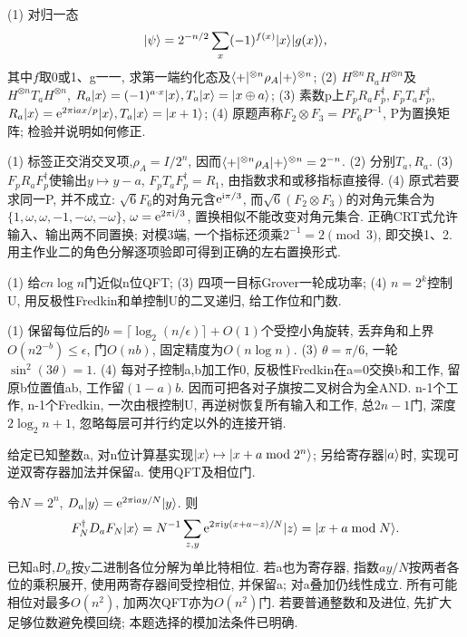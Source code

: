 \begin{exercise}(1) 对归一态
\[\lvert \psi\rangle=2^{-n/2}\sum_x(-1)^{f(x)}\lvert x\rangle\lvert g(x)\rangle,\]
其中$f$取0或1、g一一, 求第一端约化态及$\langle +\rvert^{\otimes n}\rho_A\lvert +\rangle^{\otimes n}$; (2) $H^{\otimes n}R_aH^{\otimes n}$及$H^{\otimes n}T_aH^{\otimes n}$, $R_a\lvert x\rangle=(-1)^{a\cdot x}\lvert x\rangle,T_a\lvert x\rangle=\lvert x\oplus a\rangle$; (3) 素数p上$F_pR_aF_p^\dagger,F_pT_aF_p^\dagger$,$R_a\lvert x\rangle=\mathrm e^{2\pi\mathrm i ax/p}\lvert x\rangle,T_a\lvert x\rangle=\lvert x+1\rangle$; (4) 原题声称$F_2\otimes F_3=PF_6P^{-1}$, P为置换矩阵; 检验并说明如何修正.\end{exercise}
\begin{solution}(1) 标签正交消交叉项,$\rho_A=I/2^n$, 因而$\langle +\rvert^{\otimes n}\rho_A\lvert +\rangle^{\otimes n}=2^{-n}$. (2) 分别$T_a,R_a$. (3) $F_pR_aF_p^\dagger$使输出$y\mapsto y-a$, $F_pT_aF_p^\dagger=R_1$, 由指数求和或移指标直接得. (4) 原式若要求同一P, 并不成立: $\sqrt6 F_6$的对角元含$\mathrm e^{\mathrm i\pi/3}$, 而$\sqrt6(F_2\otimes F_3)$的对角元集合为$\{1,\omega,\omega,-1,-\omega,-\omega\}$, $\omega=\mathrm e^{2\pi\mathrm i/3}$, 置换相似不能改变对角元集合. 正确CRT式允许输入、输出两不同置换; 对模3端, 一个指标还须乘$2^{-1}=2\pmod3$, 即交换1、2. 用主作业二的角色分解逐项验即可得到正确的左右置换形式.
\end{solution}
\begin{exercise}(1) 给$cn\log n$门近似n位QFT; (3) 四项一目标Grover一轮成功率; (4) $n=2^k$控制U, 用反极性Fredkin和单控制U的二叉递归, 给工作位和门数.\end{exercise}
\begin{solution}(1) 保留每位后的$b=\lceil\log_2(n/\epsilon)\rceil+O(1)$个受控小角旋转, 丢弃角和上界$O(n2^{-b})\le\epsilon$, 门$O(nb)$, 固定精度为$O(n\log n)$. (3) $\theta=\pi/6$, 一轮$\sin^2(3\theta)=1$. (4) 每对子控制a,b加工作0, 反极性Fredkin在a=0交换b和工作, 留原b位置值ab, 工作留$(1-a)b$. 因而可把各对子旗按二叉树合为全AND. n-1个工作, n-1个Fredkin, 一次由根控制U, 再逆树恢复所有输入和工作, 总$2n-1$门, 深度$2\log_2n+1$, 忽略每层可并行约定以外的连接开销.
\end{solution}

\begin{exercise}给定已知整数a, 对n位计算基实现$\lvert x\rangle\mapsto\lvert x+a\bmod2^n\rangle$; 另给寄存器$\lvert a\rangle$时, 实现可逆双寄存器加法并保留a. 使用QFT及相位门.\end{exercise}
\begin{solution}令$N=2^n$, $D_a\lvert y\rangle=\mathrm e^{2\pi\mathrm i ay/N}\lvert y\rangle$. 则
\[F_N^\dagger D_aF_N\lvert x\rangle=N^{-1}\sum_{z,y}\mathrm e^{2\pi\mathrm i y(x+a-z)/N}\lvert z\rangle=\lvert x+a\bmod N\rangle.\]
已知a时,$D_a$按y二进制各位分解为单比特相位. 若a也为寄存器, 指数$ay/N$按两者各位的乘积展开, 使用两寄存器间受控相位, 并保留a; 对a叠加仍线性成立. 所有可能相位对最多$O(n^2)$, 加两次QFT亦为$O(n^2)$门. 若要普通整数和及进位, 先扩大足够位数避免模回绕; 本题选择的模加法条件已明确.\end{solution}

